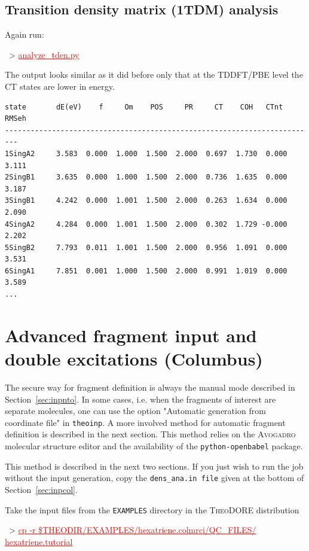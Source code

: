 \documentclass[DIV=12,headings=normal]{scrartcl}
\newcommand{\redl}[1]{{\textcolor{red}{\underline{#1}}}}
\newcommand{\comm}[1]{
\small
~> \redl{#1}
\normalsize
}
\newcommand{\theo}{\textsc{TheoDORE}}
\begin{document}
\subsection{Transition density matrix (1TDM) analysis}
Again run:

\comm{analyze\_tden.py}

The output looks similar as it did before only that at the TDDFT/PBE level the CT states are lower in energy.

\scriptsize
\begin{Verbatim}[commandchars=\\\{\}]
state       dE(eV)    f     Om    POS     PR     CT    COH   CTnt  RMSeh
-------------------------------------------------------------------------
1SingA2     3.583  0.000  1.000  1.500  2.000  0.697  1.730  0.000  3.111
2SingB1     3.635  0.000  1.000  1.500  2.000  0.736  1.635  0.000  3.187
3SingB1     4.242  0.000  1.001  1.500  2.000  0.263  1.634  0.000  2.090
4SingA2     4.284  0.000  1.001  1.500  2.000  0.302  1.729 -0.000  2.202
5SingB2     7.793  0.011  1.001  1.500  2.000  0.956  1.091  0.000  3.531
6SingA1     7.851  0.001  1.000  1.500  2.000  0.991  1.019  0.000  3.589
...
\end{Verbatim}
\normalsize

\clearpage
\section{Advanced fragment input and double excitations (Columbus)}
\label{sec:advinp}

The secure way for fragment definition is always the manual mode described in Section~\ref{sec:inpnto}.
In some cases, i.e. when the fragments of interest are separate molecules, one can use the option "Automatic generation from coordinate file" in \texttt{theoinp}.
A more involved method for automatic fragment definition is described in the next section.
This method relies on the \textsc{Avogadro} molecular structure editor and the availability of the \texttt{python-openbabel} package.

This method is described in the next two sections.
If you just wish to run the job without the input generation, copy the \texttt{dens\_ana.in file} given at the bottom of Section~\ref{sec:inpcol}.

Take the input files from the \texttt{EXAMPLES} directory in the \theo{} distribution

\comm{cp -r \$THEODIR/EXAMPLES/hexatriene.colmrci/QC\_FILES/ hexatriene.tutorial} \\
\end{document}

